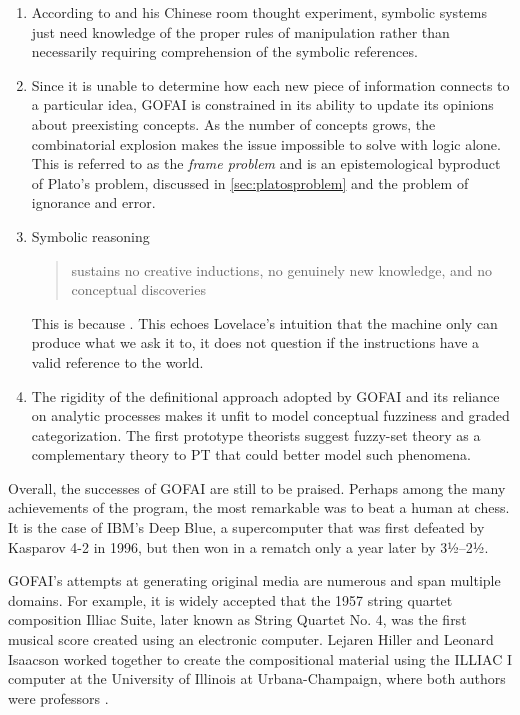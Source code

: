\begin{enumerate}
	\item According to \cite{Searle1980} and his Chinese room thought experiment, symbolic systems just need knowledge of the proper rules of manipulation rather than necessarily requiring comprehension of the symbolic references.
	\item Since it is unable to determine how each new piece of information connects to a particular idea, GOFAI is constrained in its ability to update its opinions about preexisting concepts. As the number of concepts grows, the combinatorial explosion makes the issue impossible to solve with logic alone. This is referred to as the \emph{frame problem} \citep{Dennett1984} and is an epistemological byproduct of Plato's problem, discussed in \ref{sec:platosproblem} and the problem of ignorance and error. 
	\item Symbolic reasoning \blockcquote[p. 211]{Gaerdenfors2000}{sustains no creative inductions, no genuinely new knowledge, and no conceptual discoveries}. This is because . This echoes Lovelace's intuition that the machine only can produce what we ask it to, it does not question if the instructions have a valid reference to the world. 
	\item The rigidity of the definitional approach adopted by GOFAI and its reliance on analytic processes makes it unfit to model conceptual fuzziness and graded categorization. The first prototype theorists \citep{Oden1977,Rosch1975} suggest fuzzy-set theory as a complementary theory to PT that could better model such phenomena. 
\end{enumerate}

Overall, the successes of GOFAI are still to be praised. Perhaps among the many achievements of the program, the most remarkable was to beat a human at chess. It is the case of IBM's Deep Blue, a supercomputer that was first defeated by Kasparov 4-2 in 1996, but then won in a rematch only a year later by 3½–2½.

GOFAI's attempts at generating original media are numerous and span multiple domains. For example, it is widely accepted that the 1957 string quartet composition Illiac Suite, later known as String Quartet No. 4, was the first musical score created using an electronic computer. Lejaren Hiller and Leonard Isaacson worked together to create the compositional material using the ILLIAC I computer at the University of Illinois at Urbana-Champaign, where both authors were professors \citep{Hillier1959}.

